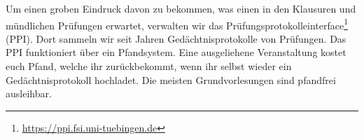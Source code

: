 Um einen groben Eindruck davon zu bekommen, was einen in den Klausuren und mündlichen Prüfungen erwartet, verwalten wir das Pr\"ufungsprotokolleinterface\footnote{\url{https://ppi.fsi.uni-tuebingen.de}} (PPI). Dort sammeln wir seit Jahren Ged\"achtnisprotokolle von Prüfungen. Das PPI funktioniert über ein Pfandsystem. Eine ausgeliehene Veranstaltung kostet euch  Pfand, welche ihr zur\"uckbekommt, wenn ihr selbst wieder ein Gedächtnisprotokoll hochladet. Die meisten Grundvorlesungen sind pfandfrei ausleihbar.	%